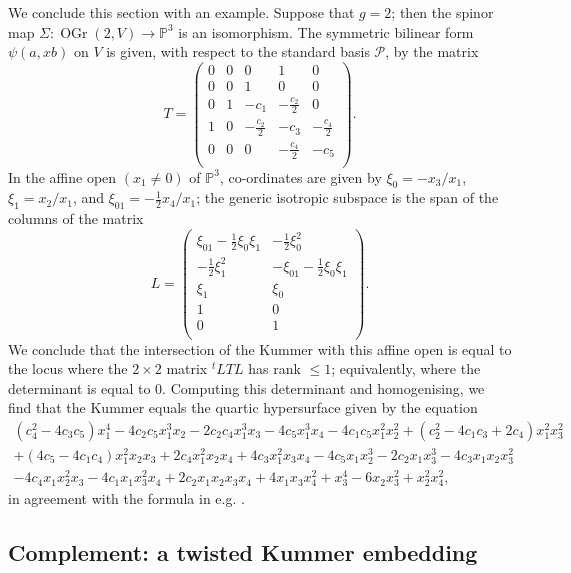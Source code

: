 \documentclass{article} %
\numberwithin{equation}{section}
\renewcommand{\P}{\mathbb{P}}
\DeclareMathOperator{\OGr}{OGr}
\begin{document}
We conclude this section with an example. Suppose that $g = 2$; then the spinor map $\Sigma\colon \OGr(2,V)\rightarrow \P^3$ is an isomorphism. The symmetric bilinear form $\psi(a, x b)$ on $V$ is given, with respect to the standard basis $\mathcal{P}$, by the matrix
\[ T =  \left(
\begin{array}{ccccc}
 0 & 0 & 0 & 1 & 0 \\
 0 & 0 & 1 & 0 & 0 \\
 0 & 1 & -c_1 & -\frac{c_2}{2} & 0 \\
 1 & 0 & -\frac{c_2}{2} & -c_3 & -\frac{c_4}{2} \\
 0 & 0 & 0 & -\frac{c_4}{2} & -c_5 \\
\end{array}
\right). \]
In the affine open $(x_1 \neq 0)$ of $\P^3$, co-ordinates are given by $\xi_0 = -x_3 / x_1$, $\xi_1 = x_2/x_1$, and $\xi_{01} = - \frac{1}{2} x_4 / x_1$; the generic isotropic subspace is the span of the columns of the matrix
\[ L =  \left(
\begin{array}{cc}
 \xi_{01} -\frac{1}{2}\xi_0 \xi_1 & -\frac{1}{2} \xi_0^2 \\
 -\frac{1}{2} \xi_1^2 & -\xi_{01}-\frac{1}{2}\xi_0 \xi_1 \\
 \xi_1 & \xi_0 \\
 1 & 0 \\
 0 & 1 \\
\end{array}
\right). \]
We conclude that the intersection of the Kummer with this affine open is equal to the locus where the $2 \times 2$ matrix ${}^t L T L$ has rank $\leq 1$; equivalently, where the determinant is equal to 0. Computing this determinant and homogenising, we find that the Kummer equals the quartic hypersurface given by the equation
\begin{multline*}  (c_4^2-4 c_3 c_5) x_1^4-4 c_2 c_5  x_1^3x_2-2 c_2 c_4  x_1^3x_3-4 c_5  x_1^3 x_4-4 c_1 c_5 x_1^2 x_2^2+(c_2^2 -4 c_1 c_3 +2 c_4 )x_1^2 x_3^2\\+(4c_5-4 c_1 c_4) x_1^2 x_2 x_3 +2 c_4 x_1^2 x_2 x_4 +4 c_3 x_1^2x_3 x_4 -4 c_5  x_1 x_2^3-2 c_2  x_1x_3^3-4 c_3 x_1 x_2 x_3^2 \\-4 c_4 x_1 x_2^2 x_3 -4 c_1 x_1 x_3^2 x_4 +2 c_2 x_1 x_2 x_3 x_4 +4 x_1 x_3 x_4^2 +x_3^4-6 x_2 x_3^2+x_2^2 x_4^2, 
\end{multline*}
in agreement with the formula in e.g. \cite[Ch. 4]{CasselsFlynnProlegomena}.

\subsection{Complement: a twisted Kummer embedding}\label{subsec_twisted_Kummer}
\end{document}
